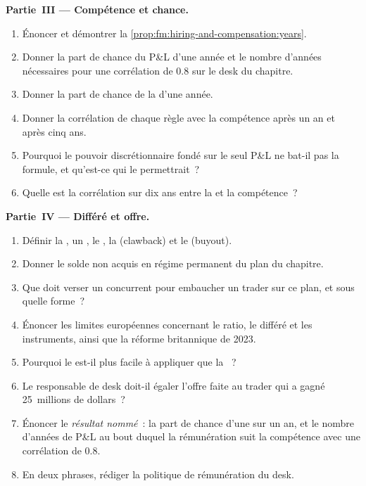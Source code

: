 \begin{problem}
\medskip\noindent\textbf{Partie~III --- Compétence et chance.}
\begin{enumerate}[resume]
\item Énoncer et démontrer la \cref{prop:fm:hiring-and-compensation:years}.
\item Donner la part de chance du P\&L d'une année et le nombre d'années nécessaires pour une corrélation de 0.8 sur le desk du chapitre.
\item Donner la part de chance de la  d'une année.
\item Donner la corrélation de chaque règle avec la compétence après un an et après cinq ans.
\item Pourquoi le pouvoir discrétionnaire fondé sur le seul P\&L ne bat-il pas la formule, et qu'est-ce qui le permettrait~?
\item Quelle est la corrélation sur dix ans entre la  et la compétence~?
\end{enumerate}

\medskip\noindent\textbf{Partie~IV --- Différé et offre.}
\begin{enumerate}[resume]
\item Définir la , un , le , la  (clawback) et le  (buyout).
\item Donner le solde non acquis en régime permanent du plan du chapitre.
\item Que doit verser un concurrent pour embaucher un trader sur ce plan, et sous quelle forme~?
\item Énoncer les limites européennes concernant le ratio, le différé et les instruments, ainsi que la réforme britannique de 2023.
\item Pourquoi le  est-il plus facile à appliquer que la ~?
\item Le responsable de desk doit-il égaler l'offre faite au trader qui a gagné 25~millions de dollars~?
\item Énoncer le \emph{résultat nommé}~: la part de chance d'une  sur un an, et le nombre d'années de P\&L au bout duquel la rémunération suit la compétence avec une
corrélation de 0.8.
\item En deux phrases, rédiger la politique de rémunération du desk.
\end{enumerate}
\end{problem}

